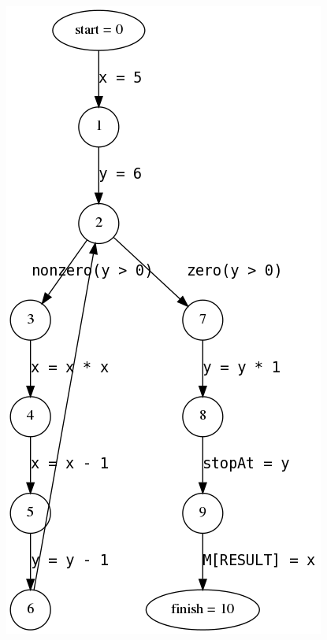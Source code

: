 \documentclass[a4paper]{article}
\begin{document}
\includegraphics[scale=0.3]{3-1.png}
\end{document}
